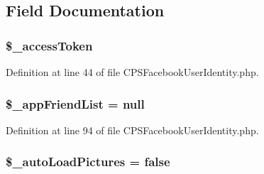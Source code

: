\subsection{Field Documentation}
\hypertarget{classCPSFacebookUserIdentity_a4baf52b9d7a98e5d1354c0184a030233}{
\subsubsection[{\$\_\-accessToken}]{\setlength{\rightskip}{0pt plus 5cm}\$\_\-accessToken}}
\label{classCPSFacebookUserIdentity_a4baf52b9d7a98e5d1354c0184a030233}


Definition at line 44 of file CPSFacebookUserIdentity.php.

\hypertarget{classCPSFacebookUserIdentity_a69ad1b664bbcbc06fbaeb07133568469}{
\subsubsection[{\$\_\-appFriendList}]{ \$\_\-appFriendList = null}}
\label{classCPSFacebookUserIdentity_a69ad1b664bbcbc06fbaeb07133568469}


Definition at line 94 of file CPSFacebookUserIdentity.php.

\hypertarget{classCPSFacebookUserIdentity_acbda478de6e55a60d9716bd3d101e40d}{
\subsubsection[{\$\_\-autoLoadPictures}]{\setlength{\rightskip}{0pt plus 5cm}\$\_\-autoLoadPictures = false}}
\label{classCPSFacebookUserIdentity_acbda478de6e55a60d9716bd3d101e40d}


